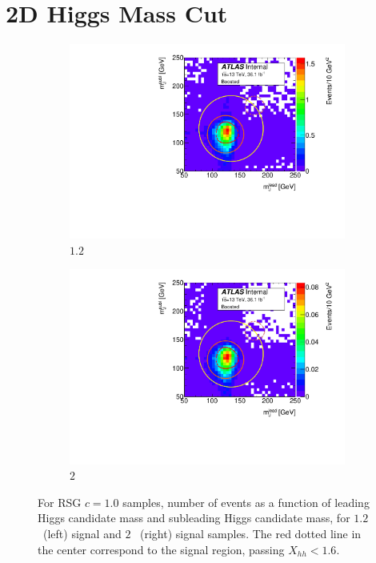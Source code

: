 \section{2D Higgs Mass Cut}
\begin{figure}[htbp!]
\centering
\captionsetup{justification=centering}
    \hspace{-2cm}
    \begin{subfigure}[b]{0.4\textwidth}
        \includegraphics[width=\textwidth,angle=-90]{figures/boosted/Truth/Sig_1200_AllTag_Incl_mH0H1.pdf}
        \caption{$1.2$\TeV~ \Grav}
        \label{fig:evt-signal-mhh_1200}
    \end{subfigure}
    \quad \quad \quad \quad
    \begin{subfigure}[b]{0.4\textwidth}
        \includegraphics[width=\textwidth,angle=-90]{figures/boosted/Truth/Sig_2000_AllTag_Incl_mH0H1.pdf}
        \caption{$2$\TeV~ \Grav}
        \label{fig:evt-signal-mhh_2000}
    \end{subfigure}
\caption{For RSG $c=1.0$ samples, number of events as a function of leading Higgs candidate mass and subleading Higgs candidate mass, for $1.2$ \TeV~(left) signal and $2$ \TeV~(right) signal samples. The red dotted line in the center correspond to the signal region, passing $X_{hh} < 1.6$.}
\label{fig:evt-signal-mhh}
\end{figure}

